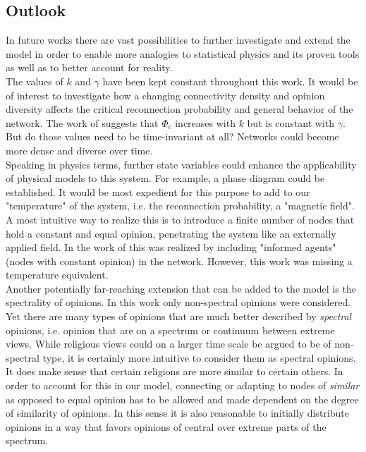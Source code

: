 \documentclass[11pt]{article}
\begin{document}
\subsection{Outlook}

In future works there are vast possibilities to further investigate and extend the model in order to enable more analogies to statistical physics and its proven tools as well as to better account for reality. \\


The values of $k$ and $\gamma$ have been kept constant throughout this work. It would be of interest to investigate how a changing connectivity density and opinion diversity affects the critical reconnection probability and general behavior of the network. The work of \cite{main paper} suggests that $\Phi_c$ increases with $k$ but is constant with $\gamma$. But do those values need to be time-invariant at all? Networks could become more dense and diverse over time. \\


Speaking in physics terms, further state variables could enhance the applicability of physical models to this system. For example, a phase diagram could be established. It would be most expedient for this purpose to add to our "temperature" of the system, i.e. the reconnection probability, a "magnetic field". A most intuitive way to realize this is to introduce a finite number of nodes that hold a constant and equal opinion, penetrating the system like an externally applied field. In the work of \cite{informed agents} this was realized by including "informed agents" (nodes with constant opinion) in the network. However, this work was missing a temperature equivalent.\\


Another potentially far-reaching extension that can be added to the model is the spectrality of opinions. In this work only non-spectral opinions were considered. Yet there are many types of opinions that are much better described by \textit{spectral} opinions, i.e. opinion that are on a spectrum or continuum between extreme views. While religious views could on a larger time scale be argued to be of non-spectral type, it is certainly more intuitive to consider them as spectral opinions. It does make sense that certain religions are more similar to certain others. In order to account for this in our model, connecting or adapting to nodes of \textit{similar} as opposed to equal opinion has to be allowed and made dependent on the degree of similarity of opinions. In this sense it is also reasonable to initially distribute opinions in a way that favors opinions of central over extreme parts of the spectrum.
\end{document}
